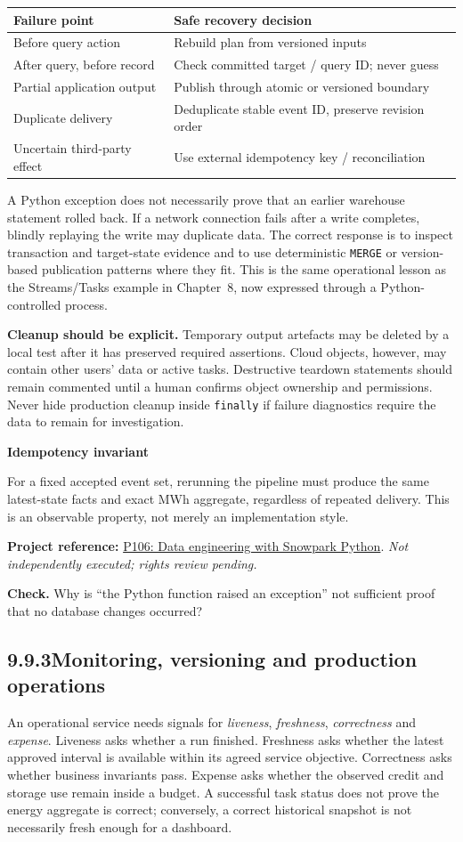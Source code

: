 \documentclass[11pt,twoside]{article}
\newcommand{\topic}[2]{\subsection*{#1\quad #2}}
\newcommand{\repo}[2]{\par\begingroup\fontsize{8.0}{9.6}\selectfont\sffamily\color{inkgray}\textbf{Project reference:} \href{#2}{#1}. \textit{Not independently executed; rights review pending.}\par\endgroup}
\begin{document}
\begin{center}\renewcommand{\arraystretch}{1.1}\begin{tabularx}{\linewidth}{@{}p{29mm}X@{}}\toprule
\textbf{Failure point}&\textbf{Safe recovery decision}\\\midrule
Before query action&Rebuild plan from versioned inputs\\
After query, before record&Check committed target / query ID; never guess\\
Partial application output&Publish through atomic or versioned boundary\\
Duplicate delivery&Deduplicate stable event ID, preserve revision order\\
Uncertain third-party effect&Use external idempotency key / reconciliation\\\bottomrule
\end{tabularx}\end{center}
A Python exception does not necessarily prove that an earlier warehouse statement rolled back. If a network connection fails after a write completes, blindly replaying the write may duplicate data. The correct response is to inspect transaction and target-state evidence and to use deterministic \texttt{MERGE} or version-based publication patterns where they fit. This is the same operational lesson as the Streams/Tasks example in Chapter~8, now expressed through a Python-controlled process.

\textbf{Cleanup should be explicit.} Temporary output artefacts may be deleted by a local test after it has preserved required assertions. Cloud objects, however, may contain other users' data or active tasks. Destructive teardown statements should remain commented until a human confirms object ownership and permissions. Never hide production cleanup inside \texttt{finally} if failure diagnostics require the data to remain for investigation.
\begin{insight}\textbf{Idempotency invariant}\par
For a fixed accepted event set, rerunning the pipeline must produce the same latest-state facts and exact MWh aggregate, regardless of repeated delivery. This is an observable property, not merely an implementation style.\end{insight}
\repo{P106: Data engineering with Snowpark Python}{https://github.com/Snowflake-Labs/sfguide-data-engineering-with-snowpark-python}
\textbf{Check.} Why is ``the Python function raised an exception'' not sufficient proof that no database changes occurred?
\newpage
\topic{9.9.3}{Monitoring, versioning and production operations}
An operational service needs signals for \emph{liveness}, \emph{freshness}, \emph{correctness} and \emph{expense}. Liveness asks whether a run finished. Freshness asks whether the latest approved interval is available within its agreed service objective. Correctness asks whether business invariants pass. Expense asks whether the observed credit and storage use remain inside a budget. A successful task status does not prove the energy aggregate is correct; conversely, a correct historical snapshot is not necessarily fresh enough for a dashboard.
\end{document}
